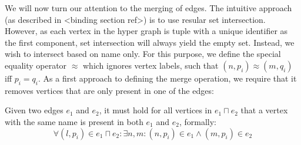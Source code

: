 \documentclass[../Master.tex]{subfiles}
\begin{document}
We will now turn our attention to the merging of edges. The intuitive approach (as described in <binding section ref>) is to use resular set intersection. However, as each vertex in the hyper graph is tuple with a unique identifier as the first component, set intersection will always yield the empty set. Instead, we wish to intersect based on name only. For this purpose, we define the special equality operator $\approx$ which ignores vertex labels, such that $\left(n,p_i\right) \approx \left(m, q_i\right)$ iff $p_i = q_i$. As a first approach to defining the merge operation, we require that it removes vertices that are only present in one of the edges:

\begin{proposition}
	Given two edges $e_1$ and $e_2$, it must hold for all vertices in $e_1 \sqcap e_2$ that a vertex with the same name is present in both $e_1$ and $e_2$, formally:
	\begin{equation*}
		\forall \left(l, p_i\right) \in e_1 \sqcap e_2 : 
		\exists n,m : \left(n, p_i\right) \in e_1 \land \left(m, p_i\right) \in e_2
	\end{equation*}
\end{proposition}
\end{document}
